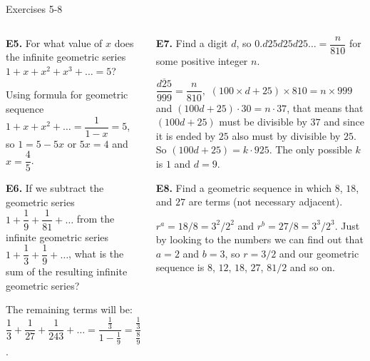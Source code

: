 \documentclass[9pt,aspectratio=169]{beamer}
\begin{document}
\begin{frame}{Exercises 5-8}
  \begin{columns}[T]
    \begin{column}{0.5\textwidth}
      \begin{problem}
        \textbf{E5.} For what value of $x$ does the infinite geometric series $1 + x + x^2 + x^3 + \ldots = 5$?
      \end{problem}
      Using formula for geometric sequence $1 + x + x^2 + \ldots = \dfrac{1}{1-x} = 5$, so $1 = 5 - 5x$ or $5x = 4$ and $x = \boxed{\dfrac{4}{5}}$.
      \begin{problem}
        \textbf{E6.} If we subtract the geometric series $1 + \dfrac{1}{9} + \dfrac{1}{81} + \ldots$ from the infinite geometric series $1 + \dfrac{1}{3} + \dfrac{1}{9} + \ldots$, what is the sum of the resulting infinite geometric series?
      \end{problem}
      The remaining terms will be:
      $\dfrac{1}{3} + \dfrac{1}{27} + \dfrac{1}{243} + \ldots = \dfrac{\frac{1}{3}}{1 - \frac{1}{9}} = \dfrac{\frac{1}{3}}{\frac{8}{9}} = \dfrac{9}{8\cdot 3} = \boxed{\dfrac{3}{8}}$.
    \end{column}
    \begin{column}{0.5\textwidth}
      \begin{problem}
        \textbf{E7.} Find a digit $d$, so $0.d25d25d25\ldots = \dfrac{n}{810}$ for some positive integer $n$.
      \end{problem}
      $\dfrac{\overline{d25}}{999} = \dfrac{n}{810},$ $(100\times d + 25)\times 810 = n \times 999$ and $(100d + 25)\cdot 30 = n\cdot 37$, that means that $(100d + 25)$ must be divisible by $37$ and since it is ended by $25$ also must by divisible by $25$. So $(100d + 25) = k\cdot 925$. The only possible $k$ is $1$ and $d = \boxed{9}$.

      \begin{problem}
        \textbf{E8.} Find a geometric sequence in which $8$, $18$, and $27$ are terms (not necessary adjacent).
      \end{problem}
      $r^a = 18/8 = 3^2 / 2^2$ and $r^b = 27/8 = 3^3/2^3$. Just by looking to the numbers we can find out that $a = 2$ and $b = 3$, so $r = 3/2$ and our geometric sequence is $8$, $12$, $18$, $27$, $81/2$ and so on.

    \end{column}
  \end{columns}
\end{frame}
\end{document}
